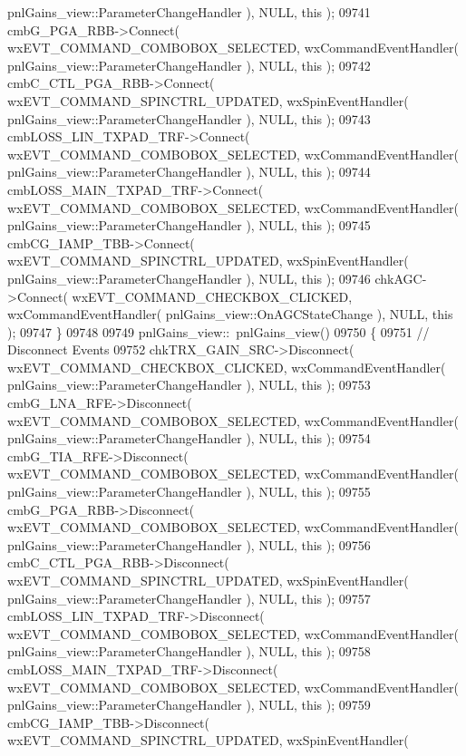 \begin{DoxyCode}
      pnlGains_view::ParameterChangeHandler ), NULL, \textcolor{keyword}{this} );
09741     cmbG_PGA_RBB->Connect( wxEVT\_COMMAND\_COMBOBOX\_SELECTED, wxCommandEventHandler( 
      pnlGains_view::ParameterChangeHandler ), NULL, \textcolor{keyword}{this} );
09742     cmbC_CTL_PGA_RBB->Connect( wxEVT\_COMMAND\_SPINCTRL\_UPDATED, wxSpinEventHandler( 
      pnlGains_view::ParameterChangeHandler ), NULL, \textcolor{keyword}{this} );
09743     cmbLOSS_LIN_TXPAD_TRF->Connect( wxEVT\_COMMAND\_COMBOBOX\_SELECTED, wxCommandEventHandler( 
      pnlGains_view::ParameterChangeHandler ), NULL, \textcolor{keyword}{this} );
09744     cmbLOSS_MAIN_TXPAD_TRF->Connect( wxEVT\_COMMAND\_COMBOBOX\_SELECTED, wxCommandEventHandler( 
      pnlGains_view::ParameterChangeHandler ), NULL, \textcolor{keyword}{this} );
09745     cmbCG_IAMP_TBB->Connect( wxEVT\_COMMAND\_SPINCTRL\_UPDATED, wxSpinEventHandler( 
      pnlGains_view::ParameterChangeHandler ), NULL, \textcolor{keyword}{this} );
09746     chkAGC->Connect( wxEVT\_COMMAND\_CHECKBOX\_CLICKED, wxCommandEventHandler( 
      pnlGains_view::OnAGCStateChange ), NULL, \textcolor{keyword}{this} );
09747 \}
09748 
09749 pnlGains_view::~pnlGains_view()
09750 \{
09751     \textcolor{comment}{// Disconnect Events}
09752     chkTRX_GAIN_SRC->Disconnect( wxEVT\_COMMAND\_CHECKBOX\_CLICKED, wxCommandEventHandler( 
      pnlGains_view::ParameterChangeHandler ), NULL, \textcolor{keyword}{this} );
09753     cmbG_LNA_RFE->Disconnect( wxEVT\_COMMAND\_COMBOBOX\_SELECTED, wxCommandEventHandler( 
      pnlGains_view::ParameterChangeHandler ), NULL, \textcolor{keyword}{this} );
09754     cmbG_TIA_RFE->Disconnect( wxEVT\_COMMAND\_COMBOBOX\_SELECTED, wxCommandEventHandler( 
      pnlGains_view::ParameterChangeHandler ), NULL, \textcolor{keyword}{this} );
09755     cmbG_PGA_RBB->Disconnect( wxEVT\_COMMAND\_COMBOBOX\_SELECTED, wxCommandEventHandler( 
      pnlGains_view::ParameterChangeHandler ), NULL, \textcolor{keyword}{this} );
09756     cmbC_CTL_PGA_RBB->Disconnect( wxEVT\_COMMAND\_SPINCTRL\_UPDATED, wxSpinEventHandler( 
      pnlGains_view::ParameterChangeHandler ), NULL, \textcolor{keyword}{this} );
09757     cmbLOSS_LIN_TXPAD_TRF->Disconnect( wxEVT\_COMMAND\_COMBOBOX\_SELECTED, wxCommandEventHandler( 
      pnlGains_view::ParameterChangeHandler ), NULL, \textcolor{keyword}{this} );
09758     cmbLOSS_MAIN_TXPAD_TRF->Disconnect( wxEVT\_COMMAND\_COMBOBOX\_SELECTED, wxCommandEventHandler( 
      pnlGains_view::ParameterChangeHandler ), NULL, \textcolor{keyword}{this} );
09759     cmbCG_IAMP_TBB->Disconnect( wxEVT\_COMMAND\_SPINCTRL\_UPDATED, wxSpinEventHandler( 

\end{DoxyCode}
